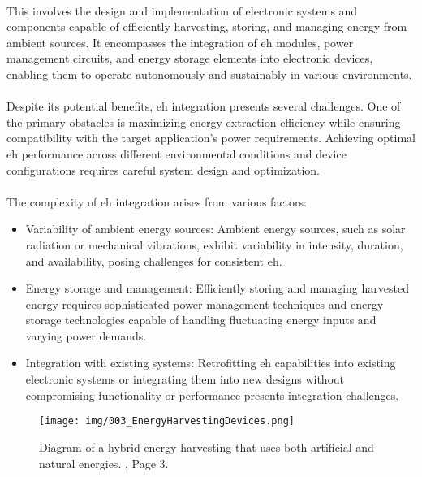         \paragraph{}
        This involves the design and implementation of electronic systems and components capable of efficiently harvesting, storing, and managing energy from ambient sources. It encompasses the integration of \gls{eh} modules, power management circuits, and energy storage elements into electronic devices, enabling them to operate autonomously and sustainably in various environments\cite{EHandEE}.

        \paragraph{}
        Despite its potential benefits, \gls{eh} integration presents several challenges. One of the primary obstacles is maximizing energy extraction efficiency while ensuring compatibility with the target application's power requirements. Achieving optimal \gls{eh} performance across different environmental conditions and device configurations requires careful system design and optimization.

        \paragraph{}
        The complexity of \gls{eh} integration arises from various factors:
        \begin{itemize}
            \item Variability of ambient energy sources: Ambient energy sources, such as solar radiation or mechanical vibrations, exhibit variability in intensity, duration, and availability, posing challenges for consistent \gls{eh}.
            \item Energy storage and management: Efficiently storing and managing harvested energy requires sophisticated power management techniques and energy storage technologies capable of handling fluctuating energy inputs and varying power demands.
            \item Integration with existing systems: Retrofitting \gls{eh} capabilities into existing electronic systems or integrating them into new designs without compromising functionality or performance presents integration challenges.
        \end{itemize}

        \begin{figure}[htbp]
            \centering
            \texttt{[image: img/003\_EnergyHarvestingDevices.png]}
            \caption{Diagram of a hybrid energy harvesting that uses both artificial and natural energies. \cite{jlpea13040062}, Page 3.}
            \label{fig:EnergyHarvestingDevices}
        \end{figure}

